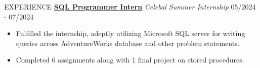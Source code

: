 \documentclass{resume} %
\begin{document}
\begin{rSection}{EXPERIENCE}
\textbf{\href{https://drive.google.com/drive/folders/1Ul-Gcsw6IRE9D73zxIeXfsSJeB5WBu85?usp=drive_link}{SQL Programmer Intern}} \textit{Celebal Summer Internship} \hfill 05/2024 - 07/2024 
\vspace{-0.6em}
\begin{itemize}
    \setlength\itemsep{-0.6em} %
    \item Fulfilled the internship, adeptly utilizing Microsoft SQL server for writing queries across AdventureWorks database and other problem statements.
    \item Completed 6 assignments along with 1 final project on stored procedures.
\end{itemize}

\end{rSection}
\end{document}
